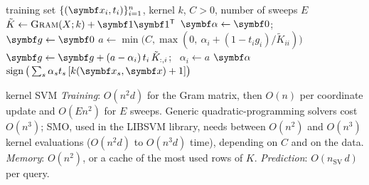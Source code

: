 \documentclass[11pt]{article}
\newcommand{\valpha}{\vect{\alpha}}
\begin{document}
\begin{algorithm}[htbp]
\caption{Kernel SVM: training by dual coordinate ascent, and prediction}\label{alg:ksvm}
\begin{algorithmic}[1]
\Require training set $\{(\x_i, t_i)\}_{i=1}^n$, kernel $k$, $C > 0$, number of sweeps $E$
  \State $\tilde K \gets \textsc{Gram}(X; k) + \vect{1}\vect{1}\T$ 
  \State $\valpha \gets \vect{0}$; \ $\vect{g} \gets \vect{0}$ 
      \State $a \gets \min\!\big(C, \max(0,\ \alpha_i + (1 - t_ig_i)/\tilde K_{ii})\big)$ 
      \State $\vect{g} \gets \vect{g} + (a - \alpha_i)\,t_i\,\tilde K_{:,i}$; \ $\alpha_i \gets a$ 
    \EndFor
  \EndFor
  \State \Return $\valpha$ 
\EndFunction
{}
  \State \Return $\operatorname{sign}\big(\sum_{s} \alpha_s t_s\, [k(\x_s, \x) + 1]\big)$ 
\EndFunction
\end{algorithmic}
\end{algorithm}

\begin{runtime}{kernel SVM}
\emph{Training}: $O(n^2 d)$ for the Gram matrix, then $O(n)$ per coordinate update and $O(En^2)$ for $E$ sweeps.
Generic quadratic-programming solvers cost $O(n^3)$; SMO, used in the LIBSVM library, needs between $O(n^2)$ and
$O(n^3)$ kernel evaluations ($O(n^2 d)$ to $O(n^3 d)$ time), depending on $C$ and on the data. \emph{Memory}: $O(n^2)$, or a cache of the most used rows of $K$.
\emph{Prediction}: $O(n_{\mathrm{SV}}\,d)$ per query.
\end{runtime}
\end{document}
